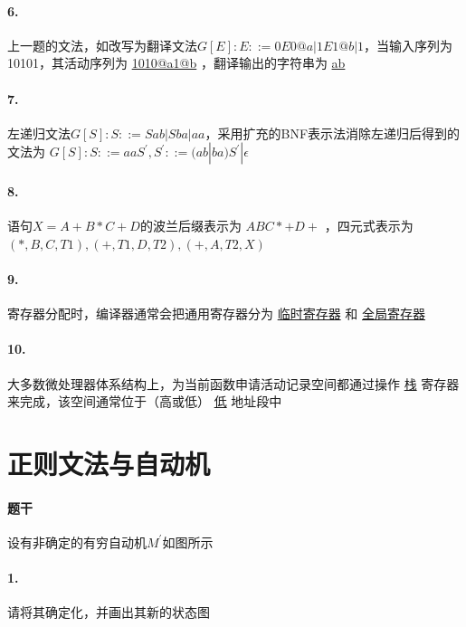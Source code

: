 \documentclass[UTF8]{ctexart} %
\begin{document}
\paragraph{6.} 上一题的文法，如改写为翻译文法$G[E]: E::=0E0@a|1E1@b|1$，当输入序列为10101，其活动序列为 \underline{1010@a1@b} ，翻译输出的字符串为 \underline{ab}

\paragraph{7.} 左递归文法$G[S]: S::=Sab|Sba|aa$，采用扩充的BNF表示法消除左递归后得到的文法为 \underline{$G[S]: S::=aaS^{'},S^{'}::=(ab|ba)S^{'}|\epsilon$}

\paragraph{8.} 语句$X=A+B*C+D$的波兰后缀表示为 \underline{$ABC*+D+$} ，四元式表示为 \underline{$(*,B,C,T1),(+,T1,D,T2),(+,A,T2,X)$}

\paragraph{9.} 寄存器分配时，编译器通常会把通用寄存器分为 \underline{临时寄存器} 和 \underline{全局寄存器}

\paragraph{10.} 大多数微处理器体系结构上，为当前函数申请活动记录空间都通过操作 \underline{栈} 寄存器来完成，该空间通常位于（高或低） \underline{低} 地址段中

\section{正则文法与自动机}

\paragraph{题干} 设有非确定的有穷自动机$M^{'}$如图所示

\paragraph{1.} 请将其确定化，并画出其新的状态图
\end{document}
